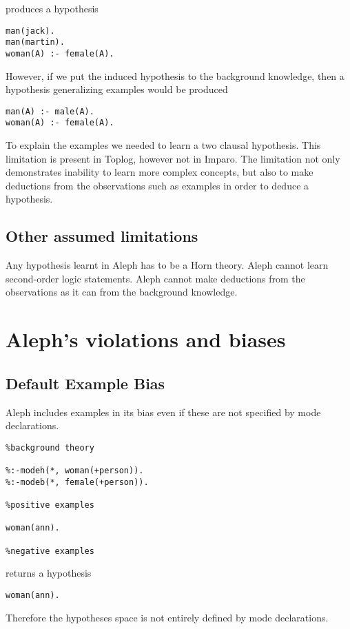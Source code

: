produces a hypothesis
\begin{lstlisting}
man(jack).
man(martin).
woman(A) :- female(A).
\end{lstlisting}

However, if we put the induced hypothesis to the background knowledge, then a hypothesis generalizing  examples would be produced
\begin{lstlisting}
man(A) :- male(A).
woman(A) :- female(A).
\end{lstlisting}

To explain the  examples we needed to learn a two clausal hypothesis. This limitation is present in Toplog, however not in Imparo. The limitation not only demonstrates inability to learn more complex concepts, but also to make deductions from the observations such as  examples in order to deduce a hypothesis.

\subsection{Other assumed limitations}
Any hypothesis learnt in Aleph has to be a Horn theory. Aleph cannot learn second-order logic statements. Aleph cannot make deductions from the observations as it can from the background knowledge.

\section{Aleph's violations and biases}

\subsection{Default Example Bias}
Aleph includes examples in its bias even if these are not specified by mode declarations.

\begin{lstlisting}
%background theory

%:-modeh(*, woman(+person)).
%:-modeb(*, female(+person)).

%positive examples

woman(ann).

%negative examples
\end{lstlisting}

returns a hypothesis
\begin{lstlisting}
woman(ann).
\end{lstlisting}

Therefore the hypotheses space is not entirely defined by mode declarations.

